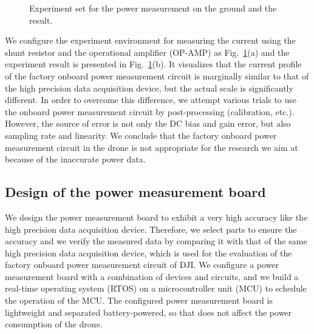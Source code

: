\documentclass[journal]{./template/IEEEtran}
\begin{document}
\begin{figure}[ht]
\centering
{}
\qquad
{}
\caption{Experiment set for the power measurement on the ground and the result.}
\label{fig:Ground_test}
\end{figure}

We configure the experiment environment for measuring the current using the shunt resistor and the operational amplifier (OP-AMP) as Fig.~\ref{fig:Ground_test}(a) and the experiment result is presented in Fig.~\ref{fig:Ground_test}(b). 
It visualizes that the current profile of the factory onboard power measurement circuit is marginally similar to that of the high precision data acquisition device, but the actual scale is significantly different. 
In order to overcome this difference, we attempt various trials to use the onboard power measurement circuit by post-processing (calibration, etc.). 
However, the source of error is not only the DC bias and gain error, but also sampling rate and linearity. 
We conclude that the factory onboard power measurement circuit in the drone is not appropriate for the research we aim at because of the inaccurate power data.





\subsection{Design of the power measurement board}
We design the power measurement board to exhibit a very high accuracy like the high precision data acquisition device.
Therefore, we select parts to ensure the accuracy and we verify the measured data by comparing it with that of the same high precision data acquisition device, which is used for the evaluation of the factory onboard power measurement circuit of DJI.
We configure a power measurement board with a combination of devices and circuits, and we build a real-time operating system (RTOS) on a microcontroller unit (MCU) to schedule the operation of the MCU. 
The configured power measurement board is lightweight and separated battery-powered, so that does not affect the power consumption of the drone.
\end{document}
